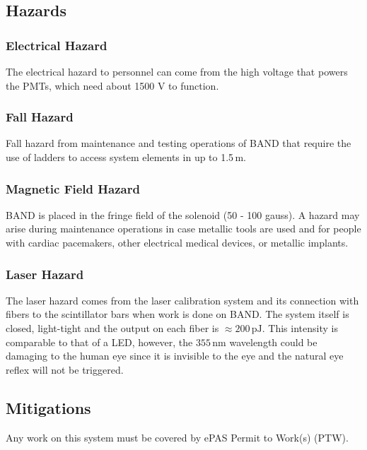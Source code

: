 \subsection{Hazards} 

\indent
\subsubsection{Electrical Hazard}

The electrical hazard to personnel can come from the high voltage that powers the PMTs, which need
about 1500 V to function. 

\subsubsection{Fall Hazard}

Fall hazard from maintenance and testing operations of BAND that require the use of ladders to access
system elements in up to 1.5\,m. 

\subsubsection{Magnetic Field Hazard}

BAND is placed in the fringe field of the solenoid (50 - 100 gauss). A hazard may arise during maintenance
operations in case metallic tools are used and for people with cardiac pacemakers, other electrical medical
devices, or metallic implants.

\subsubsection{Laser Hazard}

The laser hazard comes from the laser calibration system and its connection with fibers to the scintillator
bars when work is done on BAND. The system itself is closed, light-tight and the output on each fiber is
$\approx 200\,\mathrm{pJ}$. This intensity is comparable to that of a LED, however, the $355\,\mathrm{nm}$
wavelength could be damaging to the human eye since it is invisible to the eye and the natural eye reflex
will not be triggered. 

\subsection{Mitigations}

Any work on this system must be covered by ePAS Permit to Work(s) (PTW).

